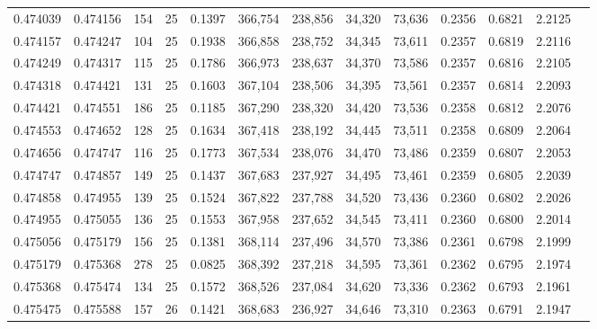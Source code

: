 \begin{tabular}{rrrrrrrrrrrrr}
0.474039 & 0.474156 &   154 &  25 &                                     0.1397 & 366,754 & 238,856 &  34,320 &  73,636 & 0.2356 & 0.6821 & 2.2125 \\
0.474157 & 0.474247 &   104 &  25 &                                     0.1938 & 366,858 & 238,752 &  34,345 &  73,611 & 0.2357 & 0.6819 & 2.2116 \\
0.474249 & 0.474317 &   115 &  25 &                                     0.1786 & 366,973 & 238,637 &  34,370 &  73,586 & 0.2357 & 0.6816 & 2.2105 \\
0.474318 & 0.474421 &   131 &  25 &                                     0.1603 & 367,104 & 238,506 &  34,395 &  73,561 & 0.2357 & 0.6814 & 2.2093 \\
0.474421 & 0.474551 &   186 &  25 &                                     0.1185 & 367,290 & 238,320 &  34,420 &  73,536 & 0.2358 & 0.6812 & 2.2076 \\
0.474553 & 0.474652 &   128 &  25 &                                     0.1634 & 367,418 & 238,192 &  34,445 &  73,511 & 0.2358 & 0.6809 & 2.2064 \\
0.474656 & 0.474747 &   116 &  25 &                                     0.1773 & 367,534 & 238,076 &  34,470 &  73,486 & 0.2359 & 0.6807 & 2.2053 \\
0.474747 & 0.474857 &   149 &  25 &                                     0.1437 & 367,683 & 237,927 &  34,495 &  73,461 & 0.2359 & 0.6805 & 2.2039 \\
0.474858 & 0.474955 &   139 &  25 &                                     0.1524 & 367,822 & 237,788 &  34,520 &  73,436 & 0.2360 & 0.6802 & 2.2026 \\
0.474955 & 0.475055 &   136 &  25 &                                     0.1553 & 367,958 & 237,652 &  34,545 &  73,411 & 0.2360 & 0.6800 & 2.2014 \\
0.475056 & 0.475179 &   156 &  25 &                                     0.1381 & 368,114 & 237,496 &  34,570 &  73,386 & 0.2361 & 0.6798 & 2.1999 \\
0.475179 & 0.475368 &   278 &  25 &                                     0.0825 & 368,392 & 237,218 &  34,595 &  73,361 & 0.2362 & 0.6795 & 2.1974 \\
0.475368 & 0.475474 &   134 &  25 &                                     0.1572 & 368,526 & 237,084 &  34,620 &  73,336 & 0.2362 & 0.6793 & 2.1961 \\
0.475475 & 0.475588 &   157 &  26 &                                     0.1421 & 368,683 & 236,927 &  34,646 &  73,310 & 0.2363 & 0.6791 & 2.1947 \\

\end{tabular}
